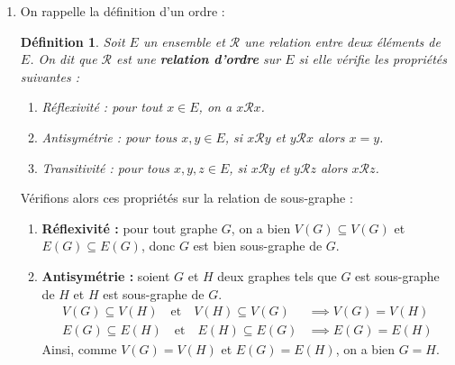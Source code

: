 \documentclass[11pt,a4paper]{article}
\newcommand{\defemph}[1]{\textbf{\color{primary}#1}}
\theoremstyle{break}
\newtheorem{definition}{Définition}
\begin{document}
\begin{td-sol}
    \begin{enumerate}
        \item On rappelle la définition d'un ordre :
        
        \begin{definition}
            Soit \(E\) un ensemble et \(\mathcal{R}\) une relation entre deux éléments de \(E\).
            On dit que \(\mathcal{R}\) est une \defemph{relation d'ordre} sur \(E\) si elle vérifie les propriétés suivantes :
            \begin{enumerate}[label=\roman*)]
                \item Réflexivité : pour tout \(x \in E\), on a \(x\mathcal{R}x\).
                \item Antisymétrie : pour tous \(x,y\in E\), si \(x\mathcal{R}y\) et \(y\mathcal{R}x\) alors \(x = y\).
                \item Transitivité : pour tous \(x,y,z\in E\), si \(x\mathcal{R}y\) et \(y\mathcal{R}z\) alors \(x\mathcal{R}z\).
            \end{enumerate}
        \end{definition}

        Vérifions alors ces propriétés sur la relation de sous-graphe :
        \begin{enumerate}[label=(\alph*)]
            \item \textbf{Réflexivité :} pour tout graphe \(G\), on a bien \(V(G) \subseteq V(G)\) et \(E(G) \subseteq E(G)\), donc \(G\) est bien sous-graphe de \(G\).

            \item \textbf{Antisymétrie :} soient \(G\) et \(H\) deux graphes tels que \(G\) est sous-graphe de \(H\) et \(H\) est sous-graphe de \(G\).
            \begin{equation*}
                \begin{aligned}
                    V(G) \subseteq V(H) \quad\text{et}\quad V(H) \subseteq V(G) &\implies V(G) = V(H) \\
                    E(G) \subseteq E(H) \quad\text{et}\quad E(H) \subseteq E(G) &\implies E(G) = E(H)
                \end{aligned}
            \end{equation*}
            Ainsi, comme \(V(G) = V(H)\) et \(E(G) = E(H)\), on a bien \(G = H\).


\end{enumerate}
\end{enumerate}
\end{td-sol}
\end{document}
